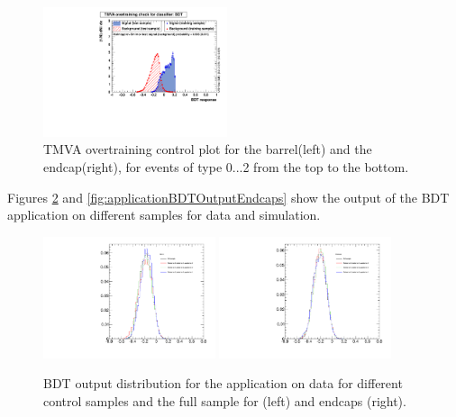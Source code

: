 \begin{figure}
                \includegraphics[width=0.48\textwidth]{Figures/bdt/overtrain_BDT_endcaps_2}
        \caption{TMVA overtraining control plot for the barrel(left) and the endcap(right), for events of type 0...2 from the top to the bottom.}
        \label{fig:overtrain_BDT_controlPlots}
\end{figure}


Figures \ref{fig:applicationBDTOutputBarrel} and \ref{fig:applicationBDTOutputEndcaps} show the output of the BDT application on different samples for data and \BsMuMu simulation.

\begin{figure}
  \centering
  \includegraphics[width=0.45\textwidth]{Figures/ApplicationBDTOutput_Barrel.pdf}
  \includegraphics[width=0.45\textwidth]{Figures/ApplicationBDTOutput_Endcaps.pdf}
  \caption{BDT output distribution for the application on data for different control samples and the full sample for (left) and endcaps (right).}
  \label{fig:applicationBDTOutputBarrel}
\end{figure}

